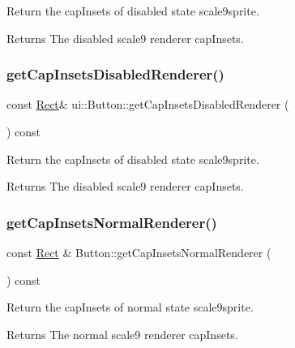 Return the cap\+Insets of disabled state scale9sprite. \begin{DoxyReturn}{Returns}
The disabled scale9 renderer cap\+Insets. 
\end{DoxyReturn}
\mbox{\label{classui_1_1Button_aeed01350a59a8fd311a5b39251385168}} 
\subsubsection{\texorpdfstring{get\+Cap\+Insets\+Disabled\+Renderer()}{getCapInsetsDisabledRenderer()}\hspace{0.1cm}{\footnotesize\ttfamily [2/2]}}
{\footnotesize\ttfamily const \hyperlink{classRect}{Rect}\& ui\+::\+Button\+::get\+Cap\+Insets\+Disabled\+Renderer (\begin{DoxyParamCaption}{ }\end{DoxyParamCaption}) const}

Return the cap\+Insets of disabled state scale9sprite. \begin{DoxyReturn}{Returns}
The disabled scale9 renderer cap\+Insets. 
\end{DoxyReturn}
\mbox{\label{classui_1_1Button_aec0c1837fc37073d0fd21761702f2e28}} 
\subsubsection{\texorpdfstring{get\+Cap\+Insets\+Normal\+Renderer()}{getCapInsetsNormalRenderer()}\hspace{0.1cm}{\footnotesize\ttfamily [1/2]}}
{\footnotesize\ttfamily const \hyperlink{classRect}{Rect} \& Button\+::get\+Cap\+Insets\+Normal\+Renderer (\begin{DoxyParamCaption}{ }\end{DoxyParamCaption}) const}

Return the cap\+Insets of normal state scale9sprite. \begin{DoxyReturn}{Returns}
The normal scale9 renderer cap\+Insets. 
\end{DoxyReturn}
\mbox{\label{classui_1_1Button_a45635a18ba15f18b0e0ca8b92eef5904}} 
